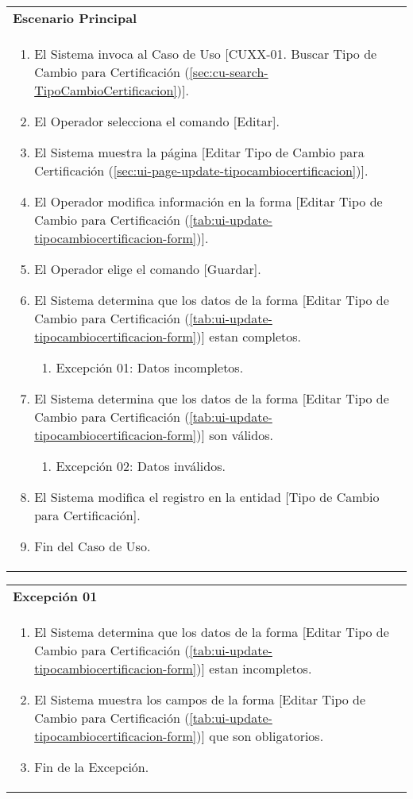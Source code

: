 \begin{tabular}{ p{15.5cm} }
	\textbf{Escenario Principal} \\
	\begin{enumerate}
		\item El Sistema invoca al Caso de Uso [CUXX-01. Buscar Tipo de Cambio para Certificación (\ref{sec:cu-search-TipoCambioCertificacion})].
		\item El Operador selecciona el comando [Editar].
		\item El Sistema muestra la página [Editar Tipo de Cambio para Certificación (\ref{sec:ui-page-update-tipocambiocertificacion})].
		\item El Operador modifica información en la forma [Editar Tipo de Cambio para Certificación (\ref{tab:ui-update-tipocambiocertificacion-form})].
		\item El Operador elige el comando [Guardar].
		\item El Sistema determina que los datos de la forma [Editar Tipo de Cambio para Certificación (\ref{tab:ui-update-tipocambiocertificacion-form})] estan completos.
			\begin{enumerate}
				\item Excepción 01: Datos incompletos.
			\end{enumerate}
		\item El Sistema determina que los datos de la forma [Editar Tipo de Cambio para Certificación (\ref{tab:ui-update-tipocambiocertificacion-form})] son válidos.
			\begin{enumerate}
				\item Excepción 02: Datos inválidos.
			\end{enumerate}
		\item El Sistema modifica el registro en la entidad [Tipo de Cambio para Certificación].
		\item Fin del Caso de Uso.
	\end{enumerate}
\end{tabular}

\begin{tabular}{ p{15.5cm} }
	\textbf{Excepción 01} \\
	\begin{enumerate}
		\item El Sistema determina que los datos de la forma [Editar Tipo de Cambio para Certificación (\ref{tab:ui-update-tipocambiocertificacion-form})] estan incompletos.
		\item El Sistema muestra los campos de la forma [Editar Tipo de Cambio para Certificación (\ref{tab:ui-update-tipocambiocertificacion-form})] que son obligatorios.
		\item Fin de la Excepción.
	\end{enumerate}
\end{tabular}


